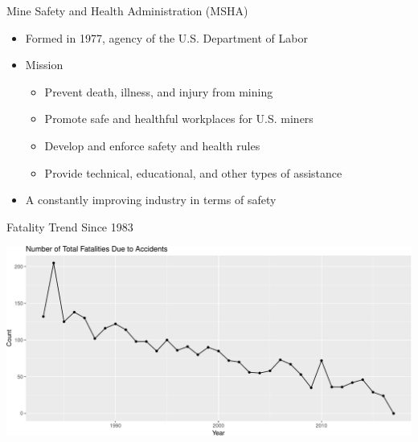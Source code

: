 \documentclass[
]{beamer}
\providecommand{\tightlist}{%
  \setlength{\itemsep}{0pt}\setlength{\parskip}{0pt}}
\begin{document}
\begin{frame}{Mine Safety and Health Administration (MSHA)}

\begin{itemize}
\tightlist
\item
  Formed in 1977, agency of the U.S. Department of Labor
\item
  Mission

  \begin{itemize}
  \tightlist
  \item
    Prevent death, illness, and injury from mining
  \item
    Promote safe and healthful workplaces for U.S. miners
  \item
    Develop and enforce safety and health rules
  \item
    Provide technical, educational, and other types of assistance
  \end{itemize}
\item
  A constantly improving industry in terms of safety
\end{itemize}

\end{frame}

\begin{frame}{Fatality Trend Since 1983}

\begin{center}\includegraphics{presentation_slides_files/figure-beamer/fatality trend-1} \end{center}

\end{frame}
\end{document}
